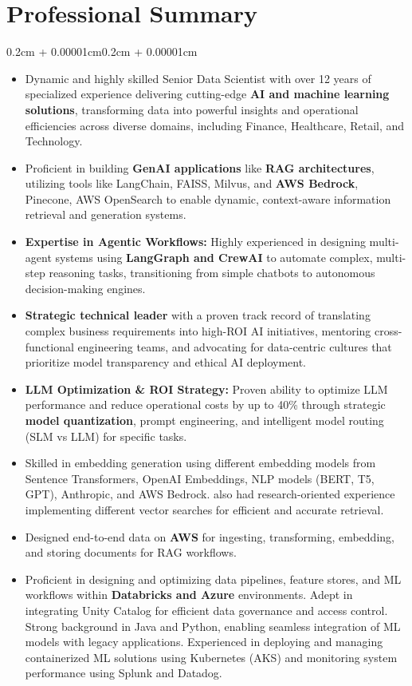 \documentclass{article}
\newenvironment{highlights}{
    \begin{itemize}[
        topsep=0.10cm, 
        parsep=0.08cm, 
        partopsep=0pt, 
        itemsep=0.08cm, 
        leftmargin=0.4cm + 10pt
    ]
}{
    \end{itemize}
}
\newenvironment{onecolentry}{
    \begin{adjustwidth}{0.2cm + 0.00001cm}{0.2cm + 0.00001cm}
}{
    \end{adjustwidth}
}
\begin{document}
\section{Professional Summary}
\begin{onecolentry}
    \begin{highlights}
        \item Dynamic and highly skilled Senior Data Scientist with over 12 years of specialized experience delivering cutting-edge \textbf{AI and machine learning solutions}, transforming data into powerful insights and operational efficiencies across diverse domains, including Finance, Healthcare, Retail, and Technology.
        \item Proficient in building \textbf{GenAI applications} like \textbf{RAG architectures}, utilizing tools like LangChain, FAISS, Milvus, and \textbf{AWS Bedrock}, Pinecone, AWS OpenSearch to enable dynamic, context-aware information retrieval and generation systems.
        \item \textbf{Expertise in Agentic Workflows:} Highly experienced in designing multi-agent systems using \textbf{LangGraph and CrewAI} to automate complex, multi-step reasoning tasks, transitioning from simple chatbots to autonomous decision-making engines.
        \item \textbf{Strategic technical leader} with a proven track record of translating complex business requirements into high-ROI AI initiatives, mentoring cross-functional engineering teams, and advocating for data-centric cultures that prioritize model transparency and ethical AI deployment.
        \item \textbf{LLM Optimization \& ROI Strategy:} Proven ability to optimize LLM performance and reduce operational costs by up to 40\% through strategic \textbf{model quantization}, prompt engineering, and intelligent model routing (SLM vs LLM) for specific tasks.
        \item Skilled in embedding generation using different embedding models from Sentence Transformers, OpenAI Embeddings, NLP models (BERT, T5, GPT), Anthropic, and AWS Bedrock. also had research-oriented experience implementing different vector searches for efficient and accurate retrieval.
        \item Designed end-to-end data     on \textbf{AWS} for ingesting, transforming, embedding, and storing documents for RAG workflows.
        \item Proficient in designing and optimizing data pipelines, feature stores, and ML workflows within \textbf{Databricks and Azure} environments. Adept in integrating Unity Catalog for efficient data governance and access control. Strong background in Java and Python, enabling seamless integration of ML models with legacy applications. Experienced in deploying and managing containerized ML solutions using Kubernetes (AKS) and monitoring system performance using Splunk and Datadog.

\end{highlights}
\end{onecolentry}
\end{document}
